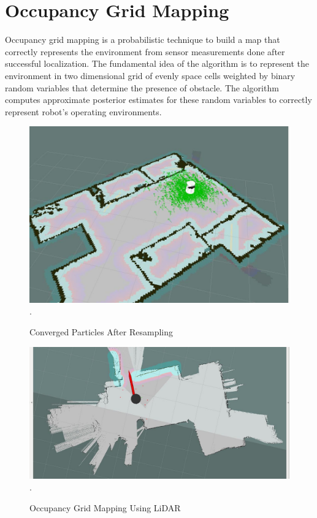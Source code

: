 \documentclass[journal,twoside]{IEEEtran}
\begin{document}
\section{Occupancy Grid Mapping}
\noindent Occupancy grid mapping is a probabilistic technique to build a map that correctly represents the environment from sensor measurements done after successful localization. The fundamental idea of the algorithm is to represent the environment in two dimensional grid of evenly space cells weighted by binary random variables that determine the presence of obstacle. The algorithm computes approximate posterior estimates for these random variables to correctly represent robot’s operating environments.
\begin{figure}[h]
\centering
\includegraphics[scale=.27]{4.jpg}
\DeclareGraphicsExtensions.
\caption{Converged Particles After Resampling}
\end{figure}
\begin{figure}[h]
\centering
\includegraphics[scale=.19]{5.jpg}
\DeclareGraphicsExtensions.
\caption{Occupancy Grid Mapping Using LiDAR}
\end{figure}
\end{document}
